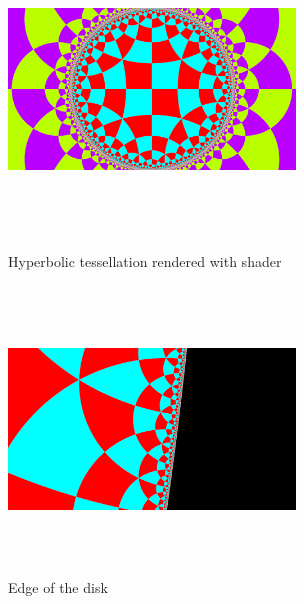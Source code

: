 \begin{figure}[htbp]
  \begin{minipage}{0.49\hsize}
   \center
   \includegraphics[width=3in, height=3in, keepaspectratio]{../img/tessellation/outer.pdf}
   \caption{Hyperbolic tessellation rendered with shader}
   \label{fig:outer}
  \end{minipage}
 \hspace*{\fill}
 \begin{minipage}{0.49\hsize}
  \center
  \includegraphics[width=3in, height=3in, keepaspectratio]{../img/tessellation/zoom.pdf}
  \caption{Edge of the disk}
  \label{fig:zoom}
 \end{minipage}
\end{figure}

